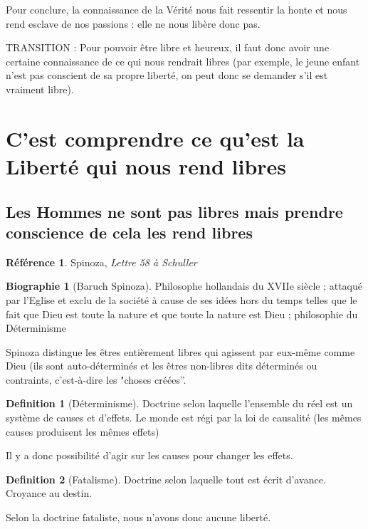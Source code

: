 \documentclass[french]{book}
\theoremstyle{definition}
\newtheorem*{dfn}{Definition}
\newtheorem*{refe}{Référence}
\newtheorem*{bio}{Biographie}
\begin{document}
Pour conclure, la connaissance de la Vérité nous fait ressentir la honte et nous rend esclave de nos passions : elle ne nous libère donc pas.

TRANSITION :
Pour pouvoir être libre et heureux, il faut donc avoir une certaine connaissance de ce qui nous rendrait libres (par exemple, le jeune enfant n’est pas conscient de sa propre liberté, on peut donc se demander s’il est vraiment libre).


\section{C’est comprendre ce qu’est la Liberté qui nous rend libres}

\subsection{Les Hommes ne sont pas libres mais prendre conscience de cela les rend libres}

\begin{refe}
	Spinoza, \textit{Lettre 58 à Schuller}
\end{refe}

\begin{bio}[Baruch Spinoza]
	Philosophe hollandais du XVIIe siècle ; attaqué par l’Eglise et exclu de la société à cause de ses idées hors du temps telles que le fait que Dieu est toute la nature et que toute la nature est Dieu ; philosophie du Déterminisme
\end{bio}

Spinoza distingue les êtres entièrement libres qui agissent par eux-même comme Dieu (ils sont auto-déterminés et les êtres non-libres dits déterminés ou contraints, c’est-à-dire les "choses créées”.

\begin{dfn}[Déterminisme]
Doctrine selon laquelle l’ensemble du réel est un système de causes et d’effets. Le monde est régi par la loi de causalité (les mêmes causes produisent les mêmes effets)
\end{dfn}

Il y a donc possibilité d’agir sur les causes pour changer les effets.

\begin{dfn}[Fatalisme]
Doctrine selon laquelle tout est écrit d’avance. Croyance au destin.
\end{dfn}

Selon la doctrine fataliste, nous n’avons donc aucune liberté.
\end{document}
